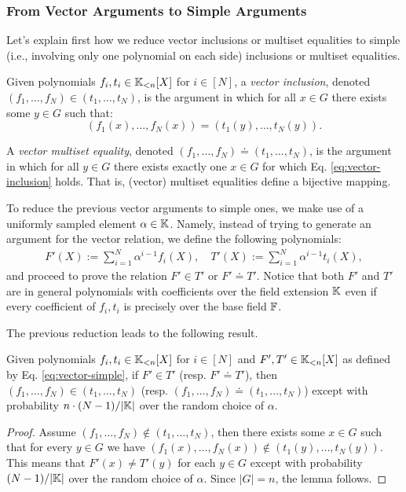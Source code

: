 \subsubsection*{From Vector Arguments to Simple Arguments}

Let's explain first how we reduce vector inclusions or multiset equalities to simple (i.e., involving only one polynomial on each side) inclusions or multiset equalities.
\begin{definition}\label{def:vec-args}
  Given polynomials $f_i,t_i \in \mathbb{K}_{<n}[X]$ for $i\in[N]$, a \textit{vector inclusion}, denoted $(f_1,\dots,f_N) \in (t_1,\dots,t_N)$, is the argument in which for all $x \in G$ there exists some $y \in G$ such that:
  \begin{equation}\label{eq:vector-inclusion}
    (f_1(x),\dots,f_N(x)) = (t_1(y),\dots,t_N(y)).
  \end{equation}

  A \textit{vector multiset equality}, denoted $(f_1,\dots,f_N) \doteq (t_1,\dots,t_N)$, is the argument in which for all $y \in G$ there exists exactly one $x \in G$ for which Eq. \eqref{eq:vector-inclusion} holds. That is, (vector) multiset equalities define a bijective mapping.
\end{definition}

To reduce the previous vector arguments to simple ones, we make use of a uniformly sampled element $\alpha \in \mathbb{K}$. Namely, instead of trying to generate an argument for the vector relation, we define the following polynomials:
\begin{align}\label{eq:vector-simple}
  F'(X) := \sum_{i=1}^N \alpha^{i-1}f_i(X), \quad T'(X) := \sum_{i=1}^N \alpha^{i-1}t_i(X),
\end{align}
and proceed to prove the relation $F' \in T'$ or $F' \doteq T'$. Notice that both $F'$ and $T'$ are in general polynomials with coefficients over the field extension $\mathbb{K}$ even if every coefficient of $f_i,t_i$ is precisely over the base field $\mathbb{F}$. 

The previous reduction leads to the following result.
\begin{lemma}\label{col:vector-to-simple}
  Given polynomials $f_i,t_i \in \mathbb{K}_{<n}[X]$ for $i\in[N]$ and $F',T' \in \mathbb{K}_{<n}[X]$ as defined by Eq. \eqref{eq:vector-simple}, if $F' \in T'$ (resp. $F' \doteq T'$), then $(f_1,\dots,f_N) \in (t_1,\dots,t_N)$ (resp. $(f_1,\dots,f_N) \doteq (t_1,\dots,t_N)$) except with probability $n \cdot (N-1)/|\mathbb{K}|$ over the random choice of $\alpha$.
\end{lemma}
\begin{proof}
Assume $(f_1,\dots,f_N) \notin (t_1,\dots,t_N)$, then there exists some $x \in G$ such that for every $y \in G$ we have $(f_1(x),\dots,f_N(x)) \notin (t_1(y),\dots,t_N(y))$. This means that $F'(x) \neq T'(y)$ for each $y \in G$ except with probability $(N-1)/|\mathbb{K}|$ over the random choice of $\alpha$. Since $|G|=n$, the lemma follows.
\end{proof}

